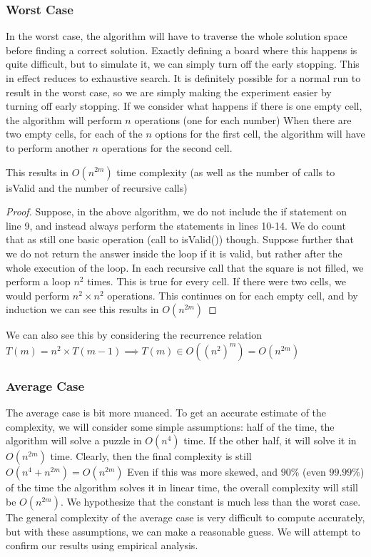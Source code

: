 \documentclass[16pt]{article}
\begin{document}
\subsubsection*{Worst Case}
In the worst case, the algorithm will have to traverse the whole solution space before finding a correct solution.
Exactly defining a board where this happens is quite difficult, but to simulate it, we can simply turn off the early stopping.
This in effect reduces to exhaustive search. It is definitely possible for a normal run to result in the worst case, so we are simply making the experiment easier by turning off early stopping.
\newline
If we consider what happens if there is one empty cell, the algorithm will perform $n$ operations (one for each number)
When there are two empty cells, for each of the $n$ options for the first cell,
the algorithm will have to perform another $n$ operations for the second cell.

This results in $O(n^{2m})$ time complexity (as well as the number of calls to isValid and the number of recursive calls)
\begin{proof}
    Suppose, in the above algorithm, we do not include the if statement on line 9, and instead always perform the statements in lines 10-14. We do count that as still one basic operation (call to isValid()) though.
    \newline
    Suppose further that we do not return the answer inside the loop if it is valid, but rather after the whole execution of the loop.
    \newline
    \newline
    In each recursive call that the square is not filled, we perform a loop $n^2$ times. This is true for every cell. If there were two cells, we would perform $n^2 \times n^2$ operations.
    \newline
    This continues on for each empty cell, and by induction we can see this results in $O(n^{2m})$
\end{proof}
We can also see this by considering the recurrence relation
\newline
$T(m) = n^2 \times T(m-1) \implies T(m) \in O((n^2)^m) = O(n^{2m})$
\subsubsection*{Average Case}

The average case is bit more nuanced. To get an accurate estimate of the complexity, we will consider some simple assumptions:
half of the time, the algorithm will solve a puzzle in $O(n^4)$ time. If the other half, it will solve it in $O(n^{2m})$ time.
Clearly, then the final complexity is still $O(n^4 + n^{2m}) = O(n^{2m})$
Even if this was more skewed, and $90\%$ (even $99.99\%$) of the time the algorithm solves it in linear time, the overall complexity will still be $O(n^{2m})$. We hypothesize that the constant is much less than the worst case. 
\newline
\newline
The general complexity of the average case is very difficult to compute accurately, but with these assumptions, we can make a reasonable guess. 
We will attempt to confirm our results using empirical analysis.
\end{document}
